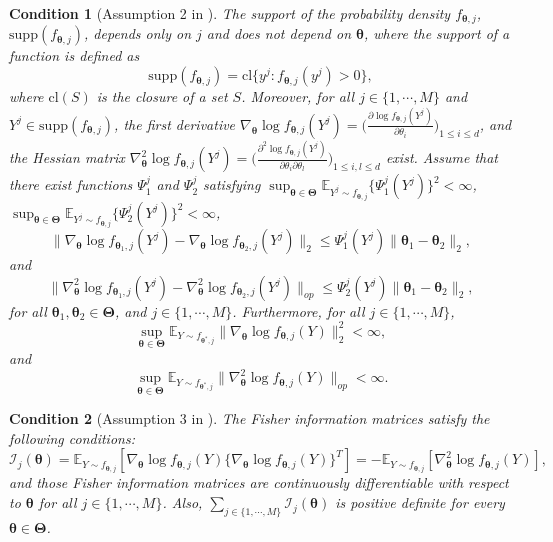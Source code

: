 \documentclass[12pt]{article}
\newcommand{\bfTheta}{\boldsymbol{\Theta}}
\newcommand{\bftheta}{\boldsymbol{\theta}}
\newtheorem{condition}{Condition}[section]
\begin{document}
\begin{condition}[Assumption 2 in ] \label{c:c2}
The support of the probability density $f_{\bftheta, j}$, $\mathrm{supp}(f_{\bftheta,j})$, depends only on $j$ and does not depend on $\bftheta$, where the support of a function is defined as
$$
\mathrm{supp}( f_{\bftheta, j} ) = \mathrm{cl} \{ y^j : f_{\bftheta, j}(y^j) > 0\},
$$
where $\mathrm{cl}(S)$ is the closure of a set $S$. Moreover, for all $j \in \{1,\cdots,M\}$ and $Y^j \in \mathrm{supp}(f_{\bftheta,j})$, the first derivative $\nabla_{\bftheta} \log f_{\bftheta, j}(Y^j) = \Big( \frac{\partial \log f_{\bftheta, j}(Y^j)}{\partial \theta_i} \Big)_{1 \leq i \leq d}$, and the Hessian matrix $\nabla_{\bftheta}^2 \log f_{\bftheta, j}(Y^j) = \Big( \frac{\partial^2 \log f_{\bftheta, j}(Y^j)}{ \partial \theta_i \partial \theta_l} \Big)_{1 \leq i,l \leq d}$ exist. Assume that there exist functions $\Psi_1^j$ and $\Psi_2^j$ satisfying $\sup_{\bftheta \in \bfTheta} \mathbb{E}_{Y^j \sim f_{\bftheta,j}} \{\Psi_1^j(Y^j) \}^2 < \infty$, $\sup_{\bftheta \in \bfTheta} \mathbb{E}_{Y^j \sim f_{\bftheta,j}} \{\Psi_2^j(Y^j) \}^2 < \infty$,
\begin{equation*}
\| \nabla_{\bftheta} \log f_{\bftheta_1, j}(Y^j) - \nabla_{\bftheta} \log f_{\bftheta_2,j}(Y^j) \|_2 \leq \Psi_1^j(Y^j) \| \bftheta_1 - \bftheta_2 \|_2,
\end{equation*}
and
\begin{equation*}
\| \nabla_{\bftheta}^2 \log f_{\bftheta_1, j}(Y^j) - \nabla_{\bftheta}^2 \log f_{\bftheta_2,j}(Y^j) \|_{op} \leq \Psi_2^j(Y^j) \| \bftheta_1 - \bftheta_2 \|_2,
\end{equation*}
for all $\bftheta_1, \bftheta_2 \in \bfTheta$, and $j \in \{1,\cdots,M\}$. Furthermore, for all $j \in \{1,\cdots,M\}$,
\begin{equation*}
\sup_{\bftheta \in \bfTheta} \mathbb{E}_{Y \sim f_{\bftheta^{\ast}, j}} \| \nabla_{\bftheta} \log f_{\bftheta,j}(Y) \|_2^2 < \infty,
\end{equation*}
and
\begin{equation*}
\sup_{\bftheta \in \bfTheta} \mathbb{E}_{Y \sim f_{\bftheta^{\ast}, j}} \| \nabla_{\bftheta}^2 \log f_{\bftheta,j}(Y) \|_{op} < \infty.
\end{equation*}
\end{condition}

\begin{condition}[Assumption 3 in ] \label{c:c3}
The Fisher information matrices satisfy the following conditions:
\begin{equation*}
\mathcal{I}_j(\bftheta) 
= \mathbb{E}_{Y \sim f_{\bftheta, j}} [ \nabla_{\bftheta} \log f_{\bftheta, j}(Y) \{ \nabla_{\bftheta} \log f_{\bftheta, j}(Y)\}^T ] 
= - \mathbb{E}_{Y \sim f_{\bftheta, j}} [\nabla_{\bftheta}^2 \log f_{\bftheta, j}(Y)],
\end{equation*}
and those Fisher information matrices are continuously differentiable with respect to $\bftheta$ for all $j \in \{1,\cdots,M\}$. Also, $\sum_{j \in \{1,\cdots,M\}} \mathcal{I}_j(\bftheta)$ is positive definite for every $\bftheta \in \bfTheta$.
\end{condition}
\end{document}

